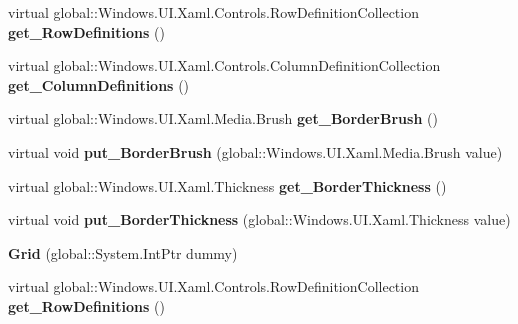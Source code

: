 \begin{DoxyCompactItemize}
virtual global\+::\+Windows.\+U\+I.\+Xaml.\+Controls.\+Row\+Definition\+Collection {\bfseries get\+\_\+\+Row\+Definitions} ()
\item 
\mbox{\label{class_windows_1_1_u_i_1_1_xaml_1_1_controls_1_1_grid_a4e77f5fdadc303d53031e20fcabf5fc6}} 
virtual global\+::\+Windows.\+U\+I.\+Xaml.\+Controls.\+Column\+Definition\+Collection {\bfseries get\+\_\+\+Column\+Definitions} ()
\item 
\mbox{\label{class_windows_1_1_u_i_1_1_xaml_1_1_controls_1_1_grid_a56ab844ebf9b8faa820b652c2c5e592b}} 
virtual global\+::\+Windows.\+U\+I.\+Xaml.\+Media.\+Brush {\bfseries get\+\_\+\+Border\+Brush} ()
\item 
\mbox{\label{class_windows_1_1_u_i_1_1_xaml_1_1_controls_1_1_grid_a27800ef05d364a3b9417b09943ae92bf}} 
virtual void {\bfseries put\+\_\+\+Border\+Brush} (global\+::\+Windows.\+U\+I.\+Xaml.\+Media.\+Brush value)
\item 
\mbox{\label{class_windows_1_1_u_i_1_1_xaml_1_1_controls_1_1_grid_ae403f1f4e529c68e04423bf21fc36cc7}} 
virtual global\+::\+Windows.\+U\+I.\+Xaml.\+Thickness {\bfseries get\+\_\+\+Border\+Thickness} ()
\item 
\mbox{\label{class_windows_1_1_u_i_1_1_xaml_1_1_controls_1_1_grid_a7ec7f388cb8d2882e412b29d60fb8e78}} 
virtual void {\bfseries put\+\_\+\+Border\+Thickness} (global\+::\+Windows.\+U\+I.\+Xaml.\+Thickness value)
\item 
\mbox{\label{class_windows_1_1_u_i_1_1_xaml_1_1_controls_1_1_grid_a8a9435e4defeeee271d7eef51280e839}} 
{\bfseries Grid} (global\+::\+System.\+Int\+Ptr dummy)
\item 
\mbox{\label{class_windows_1_1_u_i_1_1_xaml_1_1_controls_1_1_grid_a462adf0bcc5ff89fd6198b69ea3935aa}} 
virtual global\+::\+Windows.\+U\+I.\+Xaml.\+Controls.\+Row\+Definition\+Collection {\bfseries get\+\_\+\+Row\+Definitions} ()

\end{DoxyCompactItemize}
